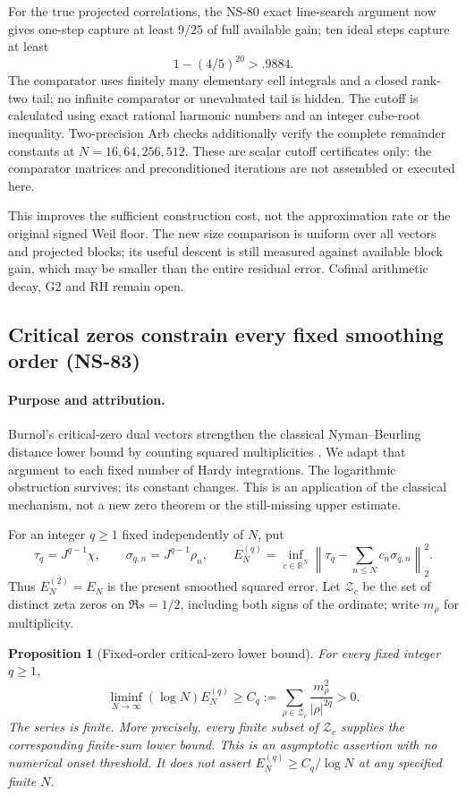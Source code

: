 \documentclass[11pt]{article}
\newtheorem{proposition}[theorem]{Proposition}
\theoremstyle{remark}
\begin{document}
For the true projected correlations, the NS-80 exact line-search argument
now gives one-step capture at least $9/25$ of full available gain; ten
ideal steps capture at least
\[
 1-(4/5)^{20}>.9884.
\]
The comparator uses finitely many elementary cell integrals and a closed
rank-two tail; no infinite comparator or unevaluated tail is hidden.
The cutoff is calculated using exact rational harmonic numbers and an
integer cube-root inequality. Two-precision Arb checks additionally
verify the complete remainder constants at $N=16,64,256,512$.
These are scalar cutoff certificates only: the comparator matrices and
preconditioned iterations are not assembled or executed here.

This improves the sufficient construction cost, not the approximation
rate or the original signed Weil floor. The new size comparison is
uniform over all vectors and projected blocks; its useful descent is
still measured against available block gain, which may be smaller than
the entire residual error. Cofinal arithmetic decay, G2 and RH remain open.

\subsection{Critical zeros constrain every fixed smoothing order (NS-83)}
\label{sec:ns83-critical-budget}

\paragraph{Purpose and attribution.}
Burnol's critical-zero dual vectors strengthen the classical
Nyman--Beurling distance lower bound by counting squared multiplicities
\cite[Sections 3--5]{BurnolLower2002}. We adapt that argument to each
fixed number of Hardy integrations. The logarithmic obstruction survives;
its constant changes. This is an application of the classical mechanism,
not a new zero theorem or the still-missing upper estimate.

For an integer $q\geq1$ fixed independently of $N$, put
\[
 \tau_q=J^{q-1}\chi,\qquad \sigma_{q,n}=J^{q-1}\rho_n,
 \qquad E_N^{(q)}=\inf_{c\in\mathbb R^N}
 \left\|\tau_q-\sum_{n\leq N}c_n\sigma_{q,n}\right\|_2^2.
\]
Thus $E_N^{(2)}=E_N$ is the present smoothed squared error.
Let $\mathcal Z_c$ be the set of distinct zeta zeros on $\Re s=1/2$,
including both signs of the ordinate; write $m_\rho$ for multiplicity.

\begin{proposition}[Fixed-order critical-zero lower bound]
\label{prop:ns83-log-floor}
For every fixed integer $q\geq1$,
\begin{equation}
 \liminf_{N\to\infty}(\log N)E_N^{(q)}
 \geq C_q:=\sum_{\rho\in\mathcal Z_c}
                  \frac{m_\rho^2}{|\rho|^{2q}}>0.
 \label{eq:ns83-log-floor}
\end{equation}
The series is finite. More precisely, every finite subset of
$\mathcal Z_c$ supplies the corresponding finite-sum lower bound.
This is an asymptotic assertion with no numerical onset threshold.
It does not assert $E_N^{(q)}\geq C_q/\log N$ at any specified finite $N$.
\end{proposition}
\end{document}
